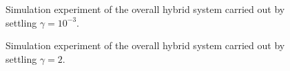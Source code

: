 %
%
%
\begin{figure}[t]
    \centering
    \vspace{-5mm}
    \caption{\footnotesize Simulation experiment of the overall hybrid system carried out by settling $\gamma = 10^{-3}$. %
	}
    \label{fig:exp1}
\end{figure}
\begin{figure}[t]
	\centering
	\vspace{-5mm}
	\caption{\footnotesize Simulation experiment of the overall hybrid system carried out by settling $\gamma = 2$. %
	}
	\label{fig:exp2}
\end{figure}
